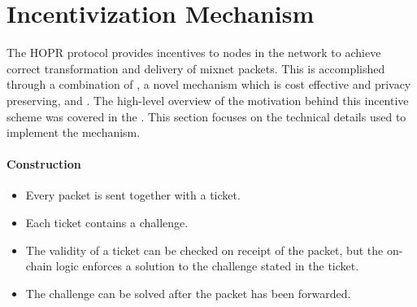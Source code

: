 \section{Incentivization Mechanism}
\label{sec:incentives}

The HOPR protocol provides incentives to nodes in the network to achieve correct transformation and delivery of mixnet packets. This is accomplished through a combination of , a novel mechanism which is cost effective and privacy preserving, and . The high-level overview of the motivation behind this incentive scheme was covered in the . This section focuses on the technical details used to implement the mechanism.

\paragraph{Construction}

\begin{itemize}
    \item Every packet is sent together with a ticket.
    \item Each ticket contains a challenge.
    \item The validity of a ticket can be checked on receipt of the packet, but the on-chain logic enforces a solution to the challenge stated in the ticket.
    \item The challenge can be solved after the packet has been forwarded.
\end{itemize}





